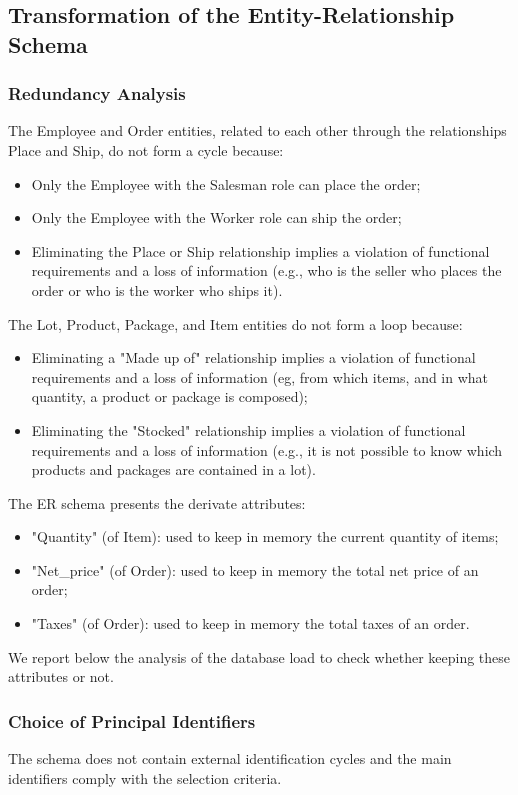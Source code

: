 \subsection{Transformation of the Entity-Relationship Schema}
\subsubsection{Redundancy Analysis}
The Employee and Order entities, related to each other through the relationships Place and Ship, do not form a cycle because:
\begin{itemize}
        \item Only the Employee with the Salesman role can place the order;
        \item Only the Employee with the Worker role can ship the order;
        \item Eliminating the Place or Ship relationship implies a violation of functional requirements and a loss of information (e.g., who is the seller who places the order or who is the worker who ships it).
\end{itemize}
The Lot, Product, Package, and Item entities do not form a loop because:
\begin{itemize}
        \item Eliminating a "Made up of" relationship implies a violation of functional requirements and a loss of information (eg, from which items, and in what quantity, a product or package is composed);
        \item Eliminating the "Stocked" relationship implies a violation of functional requirements and a loss of information (e.g., it is not possible to know which products and packages are contained in a lot).
\end{itemize}
The ER schema presents the derivate attributes:
\begin{itemize}
        \item "Quantity" (of Item): used to keep in memory the current quantity of items;
        \item "Net\_price" (of Order): used to keep in memory the total net price of an order;
        \item "Taxes" (of Order): used to keep in memory the total taxes of an order.
\end{itemize}
\vspace{0.25em}
We report below the analysis of the database load to check whether keeping these attributes or not.
\subsubsection{Choice of Principal Identifiers}
The schema does not contain external identification cycles and the main identifiers comply with the selection criteria.
